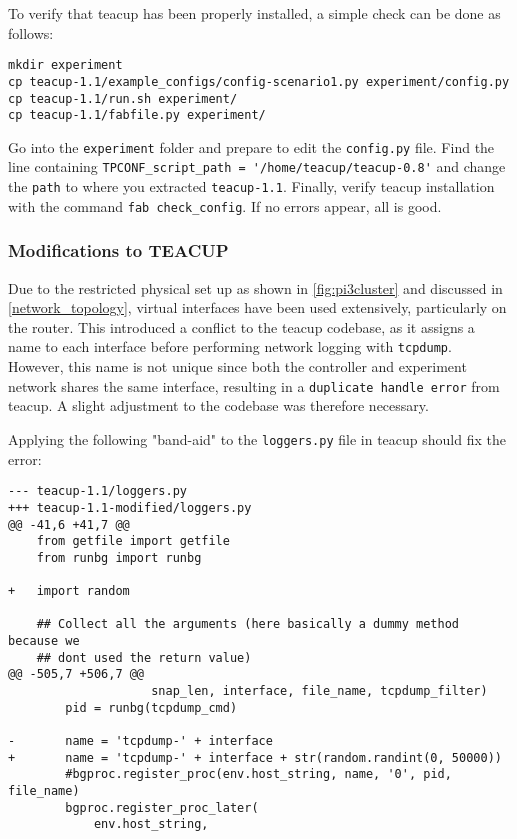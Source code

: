 To verify that \gls{teacup} has been properly installed, a simple check can be done as follows:

\begin{verbatim}
mkdir experiment
cp teacup-1.1/example_configs/config-scenario1.py experiment/config.py
cp teacup-1.1/run.sh experiment/
cp teacup-1.1/fabfile.py experiment/
\end{verbatim}

Go into the \lstinline{experiment} folder and prepare to edit the \lstinline{config.py} file. Find the line containing \lstinline{TPCONF_script_path = '/home/teacup/teacup-0.8'} and change the \lstinline{path} to where you extracted \lstinline{teacup-1.1}. Finally, verify \gls{teacup} installation with the command \lstinline{fab check_config}. If no errors appear, all is good.


\subsubsection{Modifications to TEACUP}

Due to the restricted physical set up as shown in \ref{fig:pi3cluster} and discussed in \ref{network_topology}, virtual interfaces have been used extensively, particularly on the router. This introduced a conflict to the \gls{teacup} codebase, as it assigns a name to each interface before performing network logging with \lstinline{tcpdump}. However, this name is not unique since both the controller and experiment network shares the same interface, resulting in a \lstinline{duplicate handle error} from \gls{teacup}. A slight adjustment to the codebase was therefore necessary.

Applying the following "band-aid" to the \lstinline{loggers.py} file in \gls{teacup} should fix the error:

\begin{verbatim}
--- teacup-1.1/loggers.py
+++ teacup-1.1-modified/loggers.py
@@ -41,6 +41,7 @@
    from getfile import getfile
    from runbg import runbg
    
+   import random
    
    ## Collect all the arguments (here basically a dummy method because we
    ## dont used the return value)
@@ -505,7 +506,7 @@
                    snap_len, interface, file_name, tcpdump_filter)
        pid = runbg(tcpdump_cmd)
    
-       name = 'tcpdump-' + interface
+       name = 'tcpdump-' + interface + str(random.randint(0, 50000))
        #bgproc.register_proc(env.host_string, name, '0', pid, file_name)
        bgproc.register_proc_later(
            env.host_string,
\end{verbatim}

